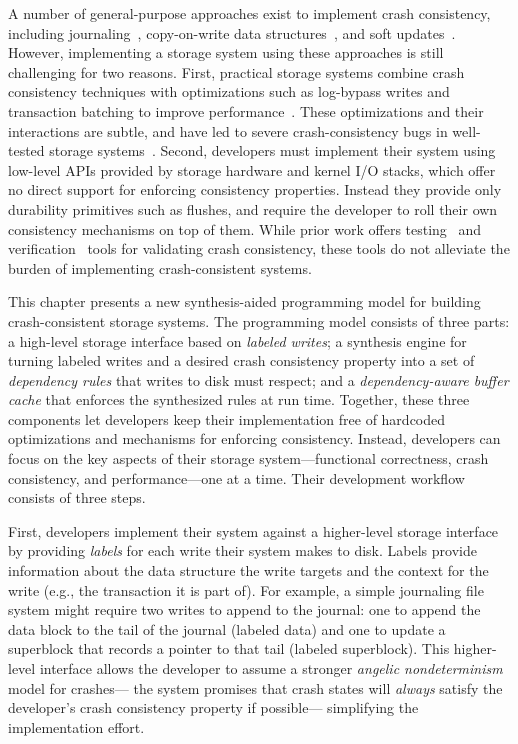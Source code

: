 A number of general-purpose approaches exist to implement crash consistency,
including journaling~\cite{prabhakaran:journaling},
copy-on-write data structures~\cite{rodeh:btrfs},
and soft updates~\cite{ganger:soft-updates}.
However, implementing a storage system using these approaches is still challenging for two reasons.
First, practical storage systems combine crash consistency techniques
with optimizations such as log-bypass writes and transaction batching to improve performance~\cite{tweedie:ext2journal}.
These optimizations and their interactions are subtle,
and have led to severe crash-consistency bugs
in well-tested storage systems~\cite{lu:fsstudy,chen:dfscq}.
Second, developers must implement their system 
using low-level APIs provided by storage hardware and kernel I/O stacks,
which offer no direct support for enforcing consistency properties.
Instead they provide only durability primitives such as flushes,
and require the developer to roll their own consistency mechanisms on top of them.
While prior work offers testing~\cite{mohan:crashmonkey,yang:explode}
and verification~\cite{chen:fscq,sigurbjarnarson:yggdrasil} tools for validating crash consistency,
these tools do not alleviate the burden of implementing crash-consistent systems.

This chapter presents a new synthesis-aided programming model for building crash-consistent storage systems.
The programming model consists of three parts: 
%
a high-level storage interface based on \emph{labeled writes};
%
a synthesis engine for turning labeled writes and a desired crash consistency property 
into a set of \emph{dependency rules} that writes to disk must respect; and 
%
a \emph{dependency-aware buffer cache} that enforces the synthesized rules at run time.
%
Together, these three components let developers keep their implementation free of 
hardcoded optimizations and mechanisms for enforcing consistency. 
%
Instead, developers can focus on the key aspects of their storage system---functional 
correctness, crash consistency, and performance---one at a time. 
%
Their development workflow consists of three steps.

First, developers implement their system against a higher-level storage interface
by providing \emph{labels} for each write their system makes to disk.
Labels provide information about the data structure the write targets
and the context for the write (e.g., the transaction it is part of).
For example, a simple journaling file system might require two writes to append to the journal:
one to append the data block to the tail of the journal (labeled \textsf{data})
and one to update a superblock that records a pointer to that tail (labeled \textsf{superblock}).
This higher-level interface allows the developer to assume a stronger
\emph{angelic nondeterminism} model for crashes---%
the system promises that crash states will \emph{always} satisfy
the developer's crash consistency property if possible---%
simplifying the implementation effort.\tighten

